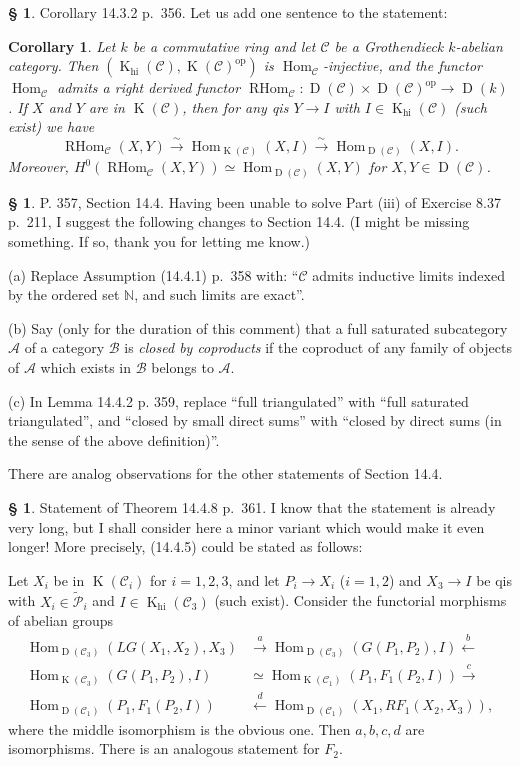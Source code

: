 \documentclass[12pt]{article}
\newtheorem{cor}[thm]{Corollary}
\theoremstyle{remark}
\theoremstyle{definition}
\newtheorem{s}[thm]{\S}
\newcommand{\bb}{\mathbb}
\newcommand{\A}{\mathcal A}
\newcommand{\B}{\mathcal B}
\newcommand{\C}{\mathcal C}
\newcommand{\mc}{\mathcal}
\newcommand{\oo}{\operatorname}
\newcommand{\xr}{\xrightarrow}
\DeclareMathOperator{\Hom}{Hom}%
\DeclareMathOperator{\op}{op}
\begin{document}
%
%
\begin{s}\label{1432b}
Corollary 14.3.2 p.~356. Let us add one sentence to the statement:
%
\begin{cor}\label{1432}
Let $k$ be a commutative ring and let $\C$ be a Grothendieck $k$-abelian category. Then $(\oo K_{\oo{hi}}(\C),\oo K(\C)^{\op})$ is $\Hom_\C$-injective, and the functor $\Hom_\C$ admits a right derived functor $\oo{RHom}_\C:\oo D(\C)\times\oo D(\C)^{\op}\to\oo D(k)$. If $X$ and $Y$ are in $\oo K(\C)$, then for any qis $Y\to I$ with $I\in\oo K_{\oo{hi}}(\C)$ (such exist) we have 
$$
\oo{RHom}_\C(X,Y)\xr\sim\Hom_{\oo K(\C)}(X,I)\xr\sim\Hom_{\oo D(\C)}(X,I).
$$ 
Moreover, $H^0(\oo{RHom}_\C(X,Y))\simeq\Hom_{\oo D(\C)}(X,Y)$ for $X,Y\in\oo D(\C)$.
\end{cor}
\end{s} 
%
%
\begin{s}\label{s144}
P. 357, Section 14.4. Having been unable to solve Part (iii) of Exercise 8.37 p.~211, I suggest the following changes to Section 14.4. (I might be missing something. If so, thank you for letting me know.)

\noindent(a) Replace Assumption (14.4.1) p.~358 with: ``$\C$ admits inductive limits indexed by the ordered set $\bb N$, and such limits are exact''.

\noindent(b) Say (only for the duration of this comment) that a full saturated subcategory $\A$ of a category $\B$ is {\em closed by coproducts} if the coproduct of any family of objects of $\A$ which exists in $\B$ belongs to $\A$.

\noindent(c) In Lemma 14.4.2 p. 359, replace ``full triangulated'' with ``full saturated triangulated'', and ``closed by small direct sums'' with ``closed by direct sums (in the sense of the above definition)''. 

There are analog observations for the other statements of Section 14.4.
\end{s}
%
%
\begin{s}\label{s1448}
Statement of Theorem 14.4.8 p.~361. I know that the statement is already very long, but I shall consider here a minor variant which would make it even longer! More precisely, (14.4.5) could be stated as follows:

Let $X_i$ be in $\oo K(\C_i)$ for $i=1,2,3$, and let $P_i\to X_i$ ($i=1,2$) and $X_3\to I$ be qis with $X_i\in\widetilde{\mc P}_i$ and $I\in\oo K_{\oo{hi}}(\C_3)$ (such exist). Consider the functorial morphisms of abelian groups
\begin{equation}\label{1448}
\begin{split}
\Hom_{\oo D(\C_3)}(LG(X_1,X_2),X_3)&\xr a\Hom_{\oo D(\C_3)}(G(P_1,P_2),I)\xleftarrow b\\ 
\Hom_{\oo K(\C_3)}(G(P_1,P_2),I)&\simeq\Hom_{\oo K(\C_1)}(P_1,F_1(P_2,I))\xr c\\ 
\Hom_{\oo D(\C_1)}(P_1,F_1(P_2,I))&\xleftarrow d\Hom_{\oo D(\C_1)}(X_1,RF_1(X_2,X_3)),
\end{split}
\end{equation}
where the middle isomorphism is the obvious one. Then $a,b,c,d$ are isomorphisms. There is an analogous statement for $F_2$.
\end{s}
\end{document}

